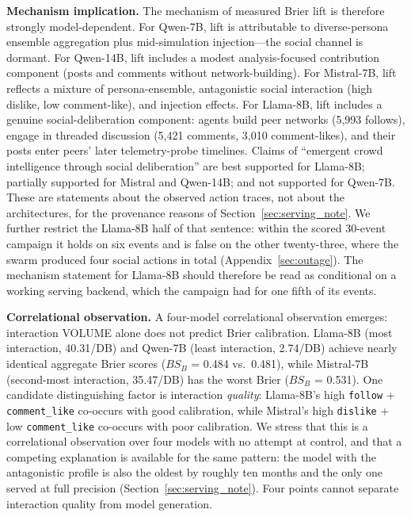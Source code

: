 \documentclass[11pt,journal,onecolumn]{IEEEtran}
\begin{document}
\textbf{Mechanism implication.} The mechanism of measured Brier lift is therefore strongly model-dependent. For Qwen-7B, lift is attributable to diverse-persona ensemble aggregation plus mid-simulation injection---the social channel is dormant. For Qwen-14B, lift includes a modest analysis-focused contribution component (posts and comments without network-building). For Mistral-7B, lift reflects a mixture of persona-ensemble, antagonistic social interaction (high dislike, low comment-like), and injection effects. For Llama-8B, lift includes a genuine social-deliberation component: agents build peer networks (5,993 follows), engage in threaded discussion (5,421 comments, 3,010 comment-likes), and their posts enter peers' later telemetry-probe timelines. Claims of ``emergent crowd intelligence through social deliberation'' are best supported for Llama-8B; partially supported for Mistral and Qwen-14B; and not supported for Qwen-7B. These are statements about the observed action traces, not about the architectures, for the provenance reasons of Section~\ref{sec:serving_note}. We further restrict the Llama-8B half of that sentence: within the scored 30-event campaign it holds on six events and is false on the other twenty-three, where the swarm produced four social actions in total (Appendix~\ref{sec:outage}). The mechanism statement for Llama-8B should therefore be read as conditional on a working serving backend, which the campaign had for one fifth of its events.

\textbf{Correlational observation.} A four-model correlational observation emerges: interaction VOLUME alone does not predict Brier calibration. Llama-8B (most interaction, 40.31/DB) and Qwen-7B (least interaction, 2.74/DB) achieve nearly identical aggregate Brier scores ($BS_B$ = 0.484 vs.\ 0.481), while Mistral-7B (second-most interaction, 35.47/DB) has the worst Brier ($BS_B$ = 0.531). One candidate distinguishing factor is interaction \emph{quality}: Llama-8B's high \texttt{follow} + \texttt{comment\_like} co-occurs with good calibration, while Mistral's high \texttt{dislike} + low \texttt{comment\_like} co-occurs with poor calibration. We stress that this is a correlational observation over four models with no attempt at control, and that a competing explanation is available for the same pattern: the model with the antagonistic profile is also the oldest by roughly ten months and the only one served at full precision (Section~\ref{sec:serving_note}). Four points cannot separate interaction quality from model generation.
\end{document}
